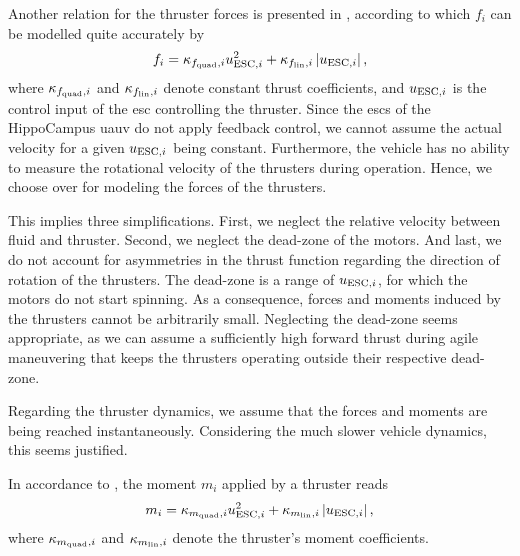 Another relation for the thruster forces is presented in \cite{Hastedt19}, according to which $f_i$ can be modelled quite accurately by
\begin{equation}
	\label{eq:thrust-function-hastedt}
	f_i = \kappa_{f_{\text{quad}}, i} u_{\text{ESC},i}^2
	+ \kappa_{f_{\text{lin}}, i} \left\lvert u_{\text{ESC},i} \right\rvert
	,
\end{equation}
where $\kappa_{f_{\text{quad}}, i}$ and $\kappa_{f_{\text{lin}}, i}$ denote constant thrust coefficients, and $u_{\text{ESC},i}$ is the control input of the \ac{esc} controlling the thruster.
Since the \acp{esc} of the HippoCampus \ac{uauv} do not apply feedback control, we cannot assume the actual velocity for a given $u_{\text{ESC},i}$ being constant.
Furthermore, the vehicle has no ability to measure the rotational velocity of the thrusters during operation.
Hence, we choose  over  for modeling the forces of the thrusters.

This implies three simplifications.
First, we neglect the relative velocity between fluid and thruster.
Second, we neglect the dead-zone of the motors.
And last, we do not account for asymmetries in the thrust function regarding the direction of rotation of the thrusters.
The dead-zone is a range of $u_{\text{ESC},i}$, for which the motors do not start spinning.
As a consequence, forces and moments induced by the thrusters cannot be arbitrarily small.
Neglecting the dead-zone seems appropriate, as we can assume a sufficiently high forward thrust during agile maneuvering that keeps the thrusters operating outside their respective dead-zone.

Regarding the thruster dynamics, we assume that the forces and moments are being reached instantaneously. Considering the much slower vehicle dynamics, this seems justified.

In accordance to , the moment $m_i$ applied by a thruster reads
\begin{equation}
	\label{eq:moment-function}
	m_i = \kappa_{m_{\text{quad}}, i} u_{\text{ESC},i}^2
	+ \kappa_{m_{\text{lin}}, i} \left\lvert u_{\text{ESC},i} \right\rvert
	,
\end{equation}
where $\kappa_{m_{\text{quad}}, i}$ and $\kappa_{m_{\text{lin}}, i}$ denote the thruster's moment coefficients.

